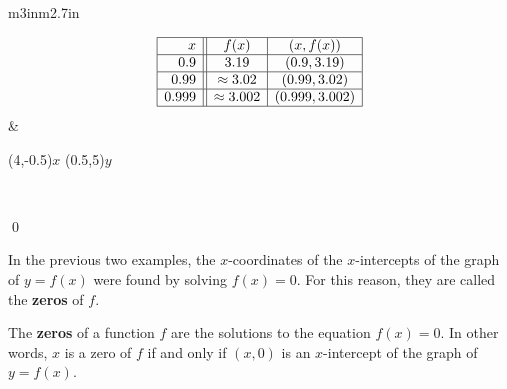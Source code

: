 \begin{ex}
\medskip

\hspace{.5in} \begin{tabular}{m{3in}m{2.7in}}

\[ \begin{array}{|r||c|c|}  \hline

 x & f(x) & (x,f(x)) \\ \hline
0.9  & 3.19 & (0.9, 3.19) \\  \hline
0.99 & \approx 3.02 & (0.99,3.02) \\  \hline
0.999 & \approx 3.002 & ( 0.999, 3.002) \\  \hline

\end{array} \] &

\begin{mfpic}[15]{-4}{4}{-5}{5}
\arrow \reverse {}
\arrow {}
\gclear {}
\axes
\tlabel[cc](4,-0.5){$x$}
\tlabel[cc](0.5,5){$y$}
\tlpointsep{5pt}
\scriptsize
{}
\normalsize
\end{mfpic} \\

\end{tabular}

\qed

\end{ex}

\pagebreak

In the previous two examples, the $x$-coordinates of the $x$-intercepts of the graph of $y=f(x)$ were found by solving $f(x) = 0$.  For this reason, they are called the  \textbf{zeros} of $f$.

\smallskip

\colorbox{ResultColor}{\bbm


\begin{defn}

\label{zerosofafunction} 

The \textbf{zeros} of a function $f$ are the solutions to the equation $f(x) = 0$.  In other words, $x$ is a zero of $f$ if and only if $(x,0)$ is an $x$-intercept of the graph of $y=f(x)$.

\end{defn}

\ebm}

